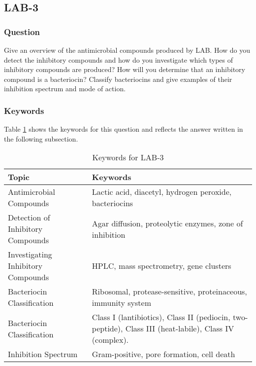 \subsection{LAB-3}
\subsubsection*{Question}
Give an overview of the antimicrobial compounds produced by LAB. How do you detect the inhibitory compounds and how do you investigate which types of inhibitory compounds are produced? How will you determine that an inhibitory compound is a bacteriocin? Classify bacteriocins and give examples of their inhibition spectrum and mode of action. 

\subsubsection*{Keywords}
Table \ref{tab:KW-LAB3} shows the keywords for this question and reflects the answer written in the following subsection.
\begin{table}[h]
    \centering
    \caption{Keywords for LAB-3} 
    \label{tab:KW-LAB3}
    \begin{tabularx}{\textwidth}{l|X}
        \textbf{Topic} & \textbf{Keywords} \\
        \hline
        Antimicrobial Compounds & Lactic acid, diacetyl, hydrogen peroxide, bacteriocins \\

        Detection of Inhibitory Compounds & Agar diffusion, proteolytic enzymes, zone of inhibition \\

        Investigating Inhibitory Compounds & HPLC, mass spectrometry, gene clusters \\

        Bacteriocin Classification & Ribosomal, protease-sensitive, proteinaceous, immunity system \\

        Bacteriocin Classification &  Class I (lantibiotics), Class II (pediocin, two-peptide), Class III (heat-labile), Class IV (complex). \\

        Inhibition Spectrum & Gram-positive, pore formation, cell death \\
        \end{tabularx}
\end{table}


